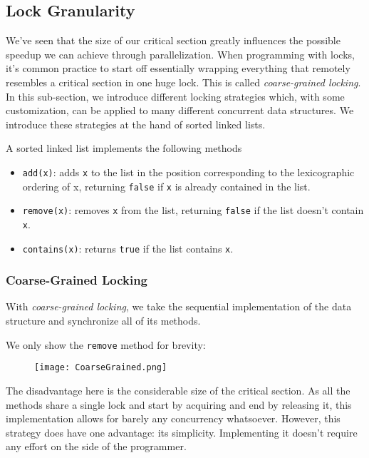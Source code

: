 \documentclass[main]{subfiles}
\begin{document}


\subsection{Lock Granularity}
We've seen that the size of our critical section greatly influences the possible speedup we can achieve through parallelization. When programming with locks, it's common practice to start off essentially wrapping everything that remotely resembles a critical section in one huge lock. This is called \textit{coarse-grained locking}. In this sub-section, we introduce different locking strategies which, with some customization, can be applied to many different concurrent data structures. We introduce these strategies at the hand of sorted linked lists. 
\begin{example}
    A sorted linked list implements the following methods
    \begin{itemize}
        \item \texttt{add(x)}: adds \texttt{x} to the list in the position corresponding to the lexicographic ordering of x, returning \texttt{false} if \texttt{x} is already contained in the list.
        \item \texttt{remove(x)}: removes \texttt{x} from the list, returning \texttt{false} if the list doesn't contain \texttt{x}.
        \item \texttt{contains(x)}: returns \texttt{true} if the list contains \texttt{x}.
    \end{itemize}
\end{example}

\subsubsection{Coarse-Grained Locking}
With \textit{coarse-grained locking}, we take the sequential implementation of the data structure and synchronize all of its methods.
\begin{example}
    We only show the \texttt{remove} method for brevity:
    \begin{figure}[H]
        \centering
        \texttt{[image: CoarseGrained.png]}
    \end{figure}
\end{example}
The disadvantage here is the considerable size of the critical section. As all the methods share a single lock and start by acquiring and end by releasing it, this implementation allows for barely any concurrency whatsoever. However, this strategy does have one advantage: its simplicity. Implementing it doesn't require any effort on the side of the programmer.
\newpage
\end{document}
